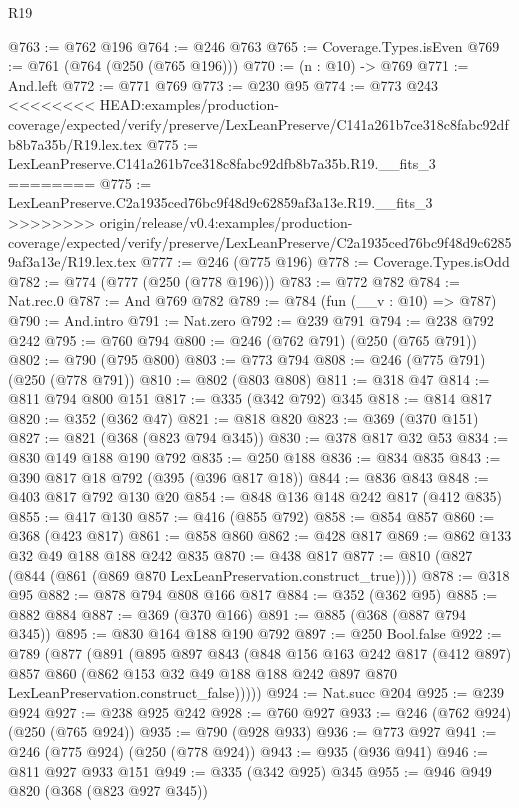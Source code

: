 \begin{lexlean}{R19}
\begin{coremodule}
{{{{{{{{{{{{{{@763 := @762 @196
@764 := @246 @763
@765 := Coverage.Types.isEven
@769 := @761 (@764 (@250 (@765 @196)))
@770 := (n : @10) -> @769
@771 := And.left
@772 := @771 @769
@773 := @230 @95
@774 := @773 @243
<<<<<<<< HEAD:examples/production-coverage/expected/verify/preserve/LexLeanPreserve/C141a261b7ce318c8fabc92dfb8b7a35b/R19.lex.tex
@775 := LexLeanPreserve.C141a261b7ce318c8fabc92dfb8b7a35b.R19.__fits_3
========
@775 := LexLeanPreserve.C2a1935ced76bc9f48d9c62859af3a13e.R19.__fits_3
>>>>>>>> origin/release/v0.4:examples/production-coverage/expected/verify/preserve/LexLeanPreserve/C2a1935ced76bc9f48d9c62859af3a13e/R19.lex.tex
@777 := @246 (@775 @196)
@778 := Coverage.Types.isOdd
@782 := @774 (@777 (@250 (@778 @196)))
@783 := @772 @782
@784 := Nat.rec.{0}
@787 := And @769 @782
@789 := @784 (fun (__v : @10) => @787)
@790 := And.intro
@791 := Nat.zero
@792 := @239 @791
@794 := @238 @792 @242
@795 := @760 @794
@800 := @246 (@762 @791) (@250 (@765 @791))
@802 := @790 (@795 @800)
@803 := @773 @794
@808 := @246 (@775 @791) (@250 (@778 @791))
@810 := @802 (@803 @808)
@811 := @318 @47
@814 := @811 @794 @800 @151
@817 := @335 (@342 @792) @345
@818 := @814 @817
@820 := @352 (@362 @47)
@821 := @818 @820
@823 := @369 (@370 @151)
@827 := @821 (@368 (@823 @794 @345))
@830 := @378 @817 @32 @53
@834 := @830 @149 @188 @190 @792
@835 := @250 @188
@836 := @834 @835
@843 := @390 @817 @18 @792 (@395 (@396 @817 @18))
@844 := @836 @843
@848 := @403 @817 @792 @130 @20
@854 := @848 @136 @148 @242 @817 (@412 @835)
@855 := @417 @130
@857 := @416 (@855 @792)
@858 := @854 @857
@860 := @368 (@423 @817)
@861 := @858 @860
@862 := @428 @817
@869 := @862 @133 @32 @49 @188 @188 @242 @835
@870 := @438 @817
@877 := @810 (@827 (@844 (@861 (@869 @870 LexLeanPreservation.construct_true))))
@878 := @318 @95
@882 := @878 @794 @808 @166 @817
@884 := @352 (@362 @95)
@885 := @882 @884
@887 := @369 (@370 @166)
@891 := @885 (@368 (@887 @794 @345))
@895 := @830 @164 @188 @190 @792
@897 := @250 Bool.false
@922 := @789
    (@877
      (@891
        (@895
          @897
          @843
          (@848
            @156
            @163
            @242
            @817
            (@412 @897)
            @857
            @860
            (@862 @153 @32 @49 @188 @188 @242 @897 @870 LexLeanPreservation.construct_false)))))
@924 := Nat.succ @204
@925 := @239 @924
@927 := @238 @925 @242
@928 := @760 @927
@933 := @246 (@762 @924) (@250 (@765 @924))
@935 := @790 (@928 @933)
@936 := @773 @927
@941 := @246 (@775 @924) (@250 (@778 @924))
@943 := @935 (@936 @941)
@946 := @811 @927 @933 @151
@949 := @335 (@342 @925) @345
@955 := @946 @949 @820 (@368 (@823 @927 @345))
}}}}}}}}}}}}}}
\end{coremodule}
\end{lexlean}
